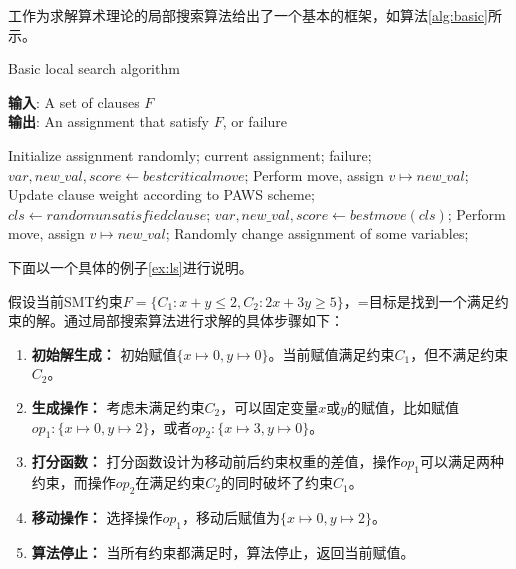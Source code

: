 工作\cite{CaiLZ2023}为求解算术理论的局部搜索算法给出了一个基本的框架，如算法\ref{alg:basic}所示。

\begin{algorithm}[t]
    \caption{Basic local search algorithm}
    \label{alg:basic}
    \textbf{输入}: A set of clauses $F$\\
    \textbf{输出}: An assignment that satisfy $F$, or failure\\
    
    \begin{algorithmic}[1] %
        \Statex \hrulefill
        \STATE Initialize assignment randomly;
        \While{\top}
                \RETURN current assignment;
            \ENDIF
                \RETURN failure;
            \ENDIF
            \STATE $var, new\_val, score \leftarrow best critical move$;
                Perform move, assign $v \mapsto new\_val$;
            \ELSE
                \STATE Update clause weight according to PAWS scheme;
                \STATE $cls \leftarrow random unsatisfied clause$;
                \STATE $var, new\_val, score \leftarrow best move(cls)$;
                    Perform move, assign $v \mapsto new\_val$;
                \ENDIF
                \STATE Randomly change assignment of some variables;
                \ENDIF
            \ENDIF
        \EndWhile
    \end{algorithmic}
\end{algorithm}

下面以一个具体的例子\ref{ex:ls}进行说明。
\begin{example}
    假设当前SMT约束$F = \{C_1: x + y \leq 2, C_2: 2x + 3y \geq 5\}$，=目标是找到一个满足约束的解。通过局部搜索算法进行求解的具体步骤如下：

    \begin{enumerate}
        \item \textbf{初始解生成：} 初始赋值$\{x \mapsto 0, y \mapsto 0\}$。当前赋值满足约束$C_1$，但不满足约束$C_2$。
        \item \textbf{生成操作：} 考虑未满足约束$C_2$，可以固定变量$x$或$y$的赋值，比如赋值$op_1: \{x \mapsto 0, y \mapsto 2\}$，或者$op_2: \{x \mapsto 3, y \mapsto 0\}$。
        \item \textbf{打分函数：} 打分函数设计为移动前后约束权重的差值，操作$op_1$可以满足两种约束，而操作$op_2$在满足约束$C_2$的同时破坏了约束$C_1$。
        \item \textbf{移动操作：} 选择操作$op_1$，移动后赋值为$\{x \mapsto 0, y \mapsto 2\}$。
        \item \textbf{算法停止：} 当所有约束都满足时，算法停止，返回当前赋值。
    \end{enumerate}
\label{ex:ls}
\end{example}

